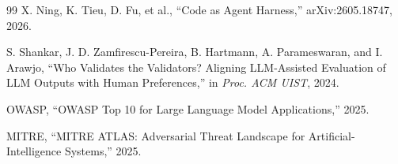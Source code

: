 \documentclass[conference]{IEEEtran}
\begin{document}
\begin{thebibliography}{99}
X. Ning, K. Tieu, D. Fu, et al., ``Code as Agent Harness,'' arXiv:2605.18747,
2026.

S. Shankar, J. D. Zamfirescu-Pereira, B. Hartmann, A. Parameswaran, and
I. Arawjo, ``Who Validates the Validators? Aligning LLM-Assisted Evaluation of
LLM Outputs with Human Preferences,'' in \emph{Proc. ACM UIST}, 2024.

OWASP, ``OWASP Top 10 for Large Language Model Applications,'' 2025.

MITRE, ``MITRE ATLAS: Adversarial Threat Landscape for Artificial-Intelligence
Systems,'' 2025.

\end{thebibliography}
\end{document}
